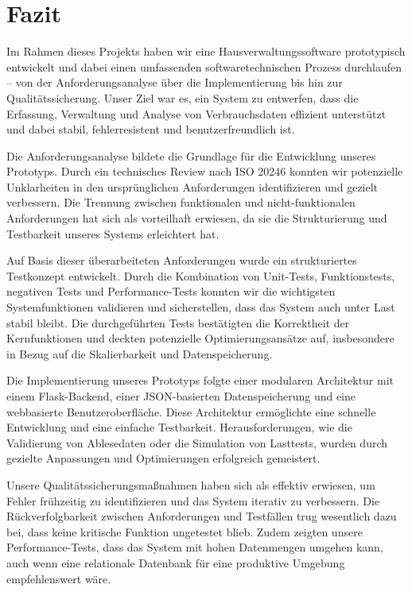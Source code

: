 \newpage
\section{Fazit}\label{sec:fazit}


Im Rahmen dieses Projekts haben wir eine Hausverwaltungssoftware prototypisch entwickelt und dabei einen umfassenden softwaretechnischen Prozess durchlaufen – von der Anforderungsanalyse über die Implementierung bis hin zur Qualitätssicherung.
Unser Ziel war es, ein System zu entwerfen, dass die Erfassung, Verwaltung und Analyse von Verbrauchsdaten effizient unterstützt und dabei stabil, fehlerresistent und benutzerfreundlich ist.

Die Anforderungsanalyse bildete die Grundlage für die Entwicklung unseres Prototyps.
Durch ein technisches Review nach ISO 20246 konnten wir potenzielle Unklarheiten in den ursprünglichen Anforderungen identifizieren und gezielt verbessern.
Die Trennung zwischen funktionalen und nicht-funktionalen Anforderungen hat sich als vorteilhaft erwiesen, da sie die Strukturierung und Testbarkeit unseres Systems erleichtert hat.

Auf Basis dieser überarbeiteten Anforderungen wurde ein strukturiertes Testkonzept entwickelt.
Durch die Kombination von Unit-Tests, Funktionstests, negativen Tests und Performance-Tests konnten wir die wichtigsten Systemfunktionen validieren und sicherstellen, dass das System auch unter Last stabil bleibt.
Die durchgeführten Tests bestätigten die Korrektheit der Kernfunktionen und deckten potenzielle Optimierungsansätze auf, insbesondere in Bezug auf die Skalierbarkeit und Datenspeicherung.

Die Implementierung unseres Prototyps folgte einer modularen Architektur mit einem Flask-Backend, einer JSON-basierten Datenspeicherung und eine webbasierte Benutzeroberfläche.
Diese Architektur ermöglichte eine schnelle Entwicklung und eine einfache Testbarkeit.
Herausforderungen, wie die Validierung von Ablesedaten oder die Simulation von Lasttests, wurden durch gezielte Anpassungen und Optimierungen erfolgreich gemeistert.

Unsere Qualitätssicherungsmaßnahmen haben sich als effektiv erwiesen, um Fehler frühzeitig zu identifizieren und das System iterativ zu verbessern. 
Die Rückverfolgbarkeit zwischen Anforderungen und Testfällen trug wesentlich dazu bei, dass keine kritische Funktion ungetestet blieb.
Zudem zeigten unsere Performance-Tests, dass das System mit hohen Datenmengen umgehen kann, auch wenn eine relationale Datenbank für eine produktive Umgebung empfehlenswert wäre.

